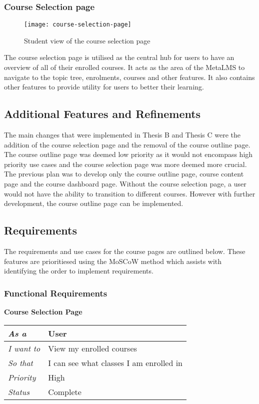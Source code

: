 \subsubsection{Course Selection page}
\begin{figure}[h]
    \centering
    \texttt{[image: course-selection-page]}
    \caption{Student view of the course selection page}
\end{figure}
The course selection page is utilised as the central hub for users to have an overview of all of their enrolled courses.
It acts as the area of the MetaLMS to navigate to the topic tree, enrolments, courses and other features.
It also contains other features to provide utility for users to better their learning.

\subsection{Additional Features and Refinements}
The main changes that were implemented in Thesis B and Thesis C were the addition of the course selection page and the removal of the course outline page.
The course outline page was deemed low priority as it would not encompass high priority use cases and the course selection page was more deemed more crucial.
The previous plan was to develop only the course outline page, course content page and the course dashboard page.
Without the course selection page, a user would not have the ability to transition to different courses.
However with further development, the course outline page can be implemented.

\subsection{Requirements}
The requirements and use cases for the course pages are outlined below.
These features are prioritiesed using the MoSCoW method which assists with identifying the order to implement requirements.

\subsubsection{Functional Requirements}

\textbf{Course Selection Page}
\FloatBarrier
\begin{table}[h!]
    \begin{tabular}{|l|l|}
        \hline
        \textit{As a} & User \\ \hline
        \textit{I want to} & View my enrolled courses \\ \hline
        \textit{So that} & I can see what classes I am enrolled in \\ \hline
        \textit{Priority} & {\color[HTML]{FE0000} High} \\ \hline
        \textit{Status} & Complete \\ \hline
    \end{tabular}
\end{table}

